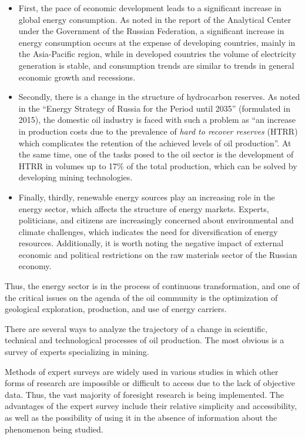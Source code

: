 \documentclass[12pt]{report}
\theoremstyle{definition}
\providecommand{\tightlist}{%
	\setlength{\itemsep}{0pt}\setlength{\parskip}{0pt}}
\begin{document}
\begin{itemize}
	\tightlist
	\item First, the pace of economic development leads to a significant increase in global energy consumption. 
	As noted in the report of the Analytical Center under the Government of the Russian Federation, a significant increase in energy consumption occurs at the expense of developing countries, mainly in the Asia-Pacific region, while in developed countries the volume of electricity generation is stable, and consumption trends are similar to trends in general economic growth and recessions.
	\item Secondly, there is a change in the structure of hydrocarbon reserves. As noted in the ``Energy Strategy of Russia for the Period until 2035'' (formulated in 2015), the domestic oil industry is faced with such a problem as ``an increase in production costs due to the prevalence of \textit{hard to recover reserves} (HTRR) which complicates the retention of the achieved levels of oil production''. 
	At the same time, one of the tasks posed to the oil sector is the development of  HTRR in volumes up to 17\% of the total production, which can be solved by developing mining technologies.
	\item Finally, thirdly, renewable energy sources play an increasing role in the energy sector, which affects the structure of energy markets.
	Experts, politicians, and citizens are increasingly concerned about environmental and climate challenges, which indicates the need for diversification of energy resources.
	Additionally, it is worth noting the negative impact of external economic and political restrictions on the raw materials sector of the Russian economy.
\end{itemize}

Thus, the energy sector is in the process of continuous transformation, and one of the critical issues on the agenda of the oil community is the optimization of geological exploration, production, and use of energy carriers.

There are several ways to analyze the trajectory of a change in scientific, technical and technological processes of oil production. The most obvious is a survey of experts specializing in mining.

Methods of expert surveys are widely used in various studies in which other forms of research are impossible or difficult to access due to the lack of objective data. 
Thus, the vast majority of foresight research is being implemented. 
The advantages of the expert survey include their relative simplicity and accessibility, as well as the possibility of using it in the absence of information about the phenomenon being studied.
\end{document}
